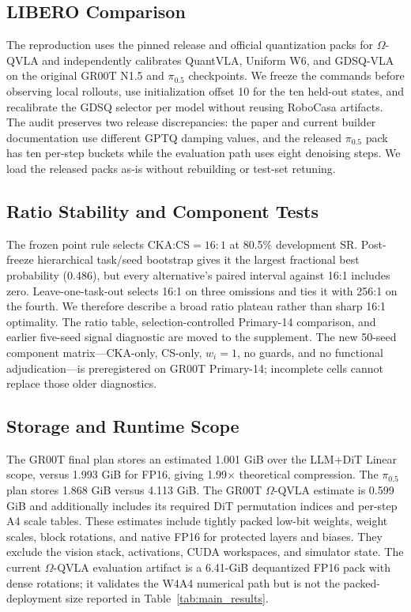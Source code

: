 \subsection{LIBERO Comparison}
\label{sec:libero_comparison}



The reproduction uses the pinned release and official quantization packs for $\Omega$-QVLA and independently calibrates QuantVLA, Uniform W6, and GDSQ-VLA on the original GR00T N1.5 and $\pi_{0.5}$ checkpoints. We freeze the commands before observing local rollouts, use initialization offset 10 for the ten held-out states, and recalibrate the GDSQ selector per model without reusing RoboCasa artifacts. The audit preserves two release discrepancies: the paper and current builder documentation use different GPTQ damping values, and the released $\pi_{0.5}$ pack has ten per-step buckets while the evaluation path uses eight denoising steps. We load the released packs as-is without rebuilding or test-set retuning.

\subsection{Ratio Stability and Component Tests}
\label{sec:ratio}

The frozen point rule selects CKA:CS$=16{:}1$ at 80.5\% development SR. Post-freeze hierarchical task/seed bootstrap gives it the largest fractional best probability (0.486), but every alternative's paired interval against 16:1 includes zero. Leave-one-task-out selects 16:1 on three omissions and ties it with 256:1 on the fourth. We therefore describe a broad ratio plateau rather than sharp 16:1 optimality. The ratio table, selection-controlled Primary-14 comparison, and earlier five-seed signal diagnostic are moved to the supplement. The new 50-seed component matrix---CKA-only, CS-only, $w_i=1$, no guards, and no functional adjudication---is preregistered on GR00T Primary-14; incomplete cells cannot replace those older diagnostics.

\subsection{Storage and Runtime Scope}
\label{sec:runtime}



The GR00T final plan stores an estimated 1.001 GiB over the LLM+DiT Linear scope, versus 1.993 GiB for FP16, giving 1.99$\times$ theoretical compression. The $\pi_{0.5}$ plan stores 1.868 GiB versus 4.113 GiB. The GR00T $\Omega$-QVLA estimate is 0.599 GiB and additionally includes its required DiT permutation indices and per-step A4 scale tables. These estimates include tightly packed low-bit weights, weight scales, block rotations, and native FP16 for protected layers and biases. They exclude the vision stack, activations, CUDA workspaces, and simulator state. The current $\Omega$-QVLA evaluation artifact is a 6.41-GiB dequantized FP16 pack with dense rotations; it validates the W4A4 numerical path but is not the packed-deployment size reported in Table~\ref{tab:main_results}.

